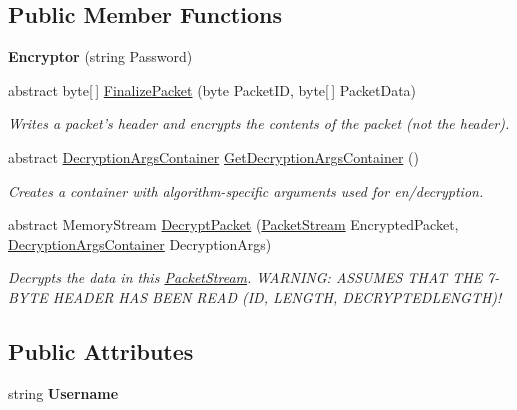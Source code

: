 \subsection*{Public Member Functions}
\begin{DoxyCompactItemize}
\item 
\hypertarget{class_gonzo_net_1_1_encryption_1_1_encryptor_a8ad0c5febf00bcc3b98e72f7fda4756b}{{\bfseries Encryptor} (string Password)}\label{class_gonzo_net_1_1_encryption_1_1_encryptor_a8ad0c5febf00bcc3b98e72f7fda4756b}

\item 
abstract byte\mbox{[}$\,$\mbox{]} \hyperlink{class_gonzo_net_1_1_encryption_1_1_encryptor_a643ace08851e38fb7c9dc33e7c65d726}{Finalize\+Packet} (byte Packet\+I\+D, byte\mbox{[}$\,$\mbox{]} Packet\+Data)
\begin{DoxyCompactList}\small\item\em Writes a packet's header and encrypts the contents of the packet (not the header). \end{DoxyCompactList}\item 
abstract \hyperlink{class_gonzo_net_1_1_encryption_1_1_decryption_args_container}{Decryption\+Args\+Container} \hyperlink{class_gonzo_net_1_1_encryption_1_1_encryptor_a885125d3d4fd76914f77a9507c948d1b}{Get\+Decryption\+Args\+Container} ()
\begin{DoxyCompactList}\small\item\em Creates a container with algorithm-\/specific arguments used for en/decryption. \end{DoxyCompactList}\item 
abstract Memory\+Stream \hyperlink{class_gonzo_net_1_1_encryption_1_1_encryptor_a19f7888066c3deea6eb688509b9fbf82}{Decrypt\+Packet} (\hyperlink{class_gonzo_net_1_1_packet_stream}{Packet\+Stream} Encrypted\+Packet, \hyperlink{class_gonzo_net_1_1_encryption_1_1_decryption_args_container}{Decryption\+Args\+Container} Decryption\+Args)
\begin{DoxyCompactList}\small\item\em Decrypts the data in this \hyperlink{class_gonzo_net_1_1_packet_stream}{Packet\+Stream}. W\+A\+R\+N\+I\+N\+G\+: A\+S\+S\+U\+M\+E\+S T\+H\+A\+T T\+H\+E 7-\/\+B\+Y\+T\+E H\+E\+A\+D\+E\+R H\+A\+S B\+E\+E\+N R\+E\+A\+D (I\+D, L\+E\+N\+G\+T\+H, D\+E\+C\+R\+Y\+P\+T\+E\+D\+L\+E\+N\+G\+T\+H)! \end{DoxyCompactList}\end{DoxyCompactItemize}
\subsection*{Public Attributes}
\begin{DoxyCompactItemize}
\item 
\hypertarget{class_gonzo_net_1_1_encryption_1_1_encryptor_a2c4ebb66c8f338f127b67fa3f611963a}{string {\bfseries Username}}\label{class_gonzo_net_1_1_encryption_1_1_encryptor_a2c4ebb66c8f338f127b67fa3f611963a}

\end{DoxyCompactItemize}
